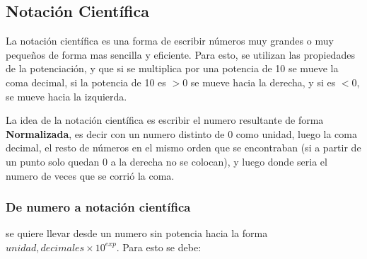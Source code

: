 \newpage
\subsection{Notación Científica}
    La notación científica es una forma de escribir números muy grandes o muy pequeños
    de forma mas sencilla y eficiente. Para esto, se utilizan las propiedades de
    la potenciación, y que si se multiplica por una potencia de 10 se mueve la
    coma decimal, si la potencia de 10 es $>0$ se mueve hacia la derecha, y si
    es $<0$, se mueve hacia la izquierda.

    La idea de la notación científica es escribir el numero resultante de forma
    \textbf{Normalizada}, es decir con un numero distinto de 0 como unidad, luego
    la coma decimal, el resto de números en el mismo orden que se encontraban (si
    a partir de un punto solo quedan 0 a la derecha no se colocan), y luego
     donde  seria el numero de veces que
    se corrió la coma.


\subsubsection*{De numero a notación científica}
    se quiere llevar desde un numero sin potencia hacia la forma
    $unidad, decimales \times10^{exp}$. Para esto se debe:

